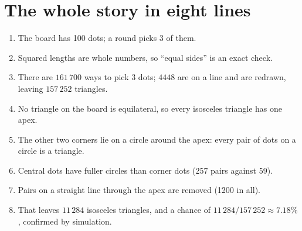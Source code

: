 \documentclass[11pt,a4paper]{article}
\begin{document}
\section{The whole story in eight lines}

\begin{enumerate}[nosep]
  \item The board has 100 dots; a round picks 3 of them.
  \item Squared lengths are whole numbers, so ``equal sides'' is an exact check.
  \item There are $161\,700$ ways to pick 3 dots; $4448$ are on a line and are
        redrawn, leaving $157\,252$ triangles.
  \item No triangle on the board is equilateral, so every isosceles triangle has
        one apex.
  \item The other two corners lie on a circle around the apex: every pair of dots on
        a circle is a triangle.
  \item Central dots have fuller circles than corner dots (257 pairs against 59).
  \item Pairs on a straight line through the apex are removed (1200 in all).
  \item That leaves $11\,284$ isosceles triangles, and a chance of
        $11\,284/157\,252\approx7.18\%$, confirmed by simulation.
\end{enumerate}
\end{document}
